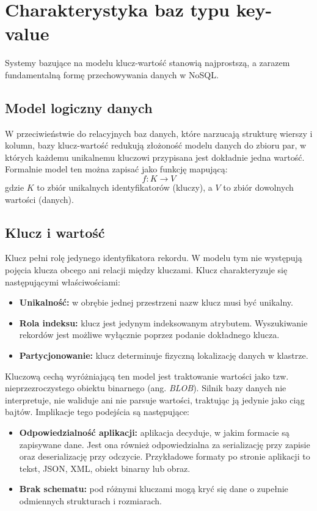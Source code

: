 \section{Charakterystyka baz typu key-value}
Systemy bazujące na modelu klucz-wartość stanowią najprostszą, a zarazem fundamentalną formę przechowywania danych w NoSQL.
\subsection{Model logiczny danych}
W przeciwieństwie do relacyjnych baz danych, które narzucają strukturę wierszy i kolumn, bazy klucz-wartość redukują złożoność modelu danych do zbioru par, w których każdemu unikalnemu kluczowi przypisana jest dokładnie jedna wartość. Formalnie model ten można zapisać jako funkcję mapującą:
\begin{equation}
    f: K \rightarrow V
\end{equation}
gdzie $K$ to zbiór unikalnych identyfikatorów (kluczy), a $V$ to zbiór dowolnych wartości (danych).
\subsection{Klucz i wartość}
Klucz pełni rolę jedynego identyfikatora rekordu. W modelu tym nie występują pojęcia klucza obcego ani relacji między kluczami. Klucz charakteryzuje się następującymi właściwościami:
\begin{itemize}
    \item \textbf{Unikalność:} w obrębie jednej przestrzeni nazw klucz musi być unikalny.
    \item \textbf{Rola indeksu:} klucz jest jedynym indeksowanym atrybutem. Wyszukiwanie rekordów jest możliwe wyłącznie poprzez podanie dokładnego klucza.
    \item \textbf{Partycjonowanie:} klucz determinuje fizyczną lokalizację danych w klastrze.
\end{itemize}
Kluczową cechą wyróżniającą ten model jest traktowanie wartości jako tzw. nieprzezroczystego obiektu binarnego (ang. \emph{BLOB}). Silnik bazy danych nie interpretuje, nie waliduje ani nie parsuje wartości, traktując ją jedynie jako ciąg bajtów. Implikacje tego podejścia są następujące:
\begin{itemize}
    \item \textbf{Odpowiedzialność aplikacji:} aplikacja decyduje, w jakim formacie są zapisywane dane. Jest ona również odpowiedzialna za serializację przy zapisie oraz deserializację przy odczycie. Przykładowe formaty po stronie aplikacji to tekst, JSON, XML, obiekt binarny lub obraz.
    \item \textbf{Brak schematu:} pod różnymi kluczami mogą kryć się dane o zupełnie odmiennych strukturach i rozmiarach.
\end{itemize}
